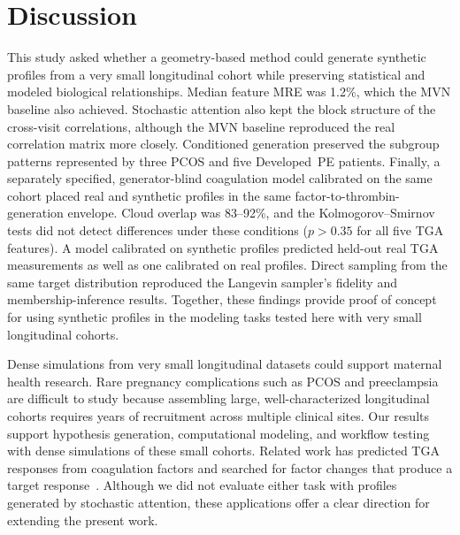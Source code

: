 \section{Discussion}
\label{sec:discussion}

This study asked whether a geometry-based method could generate synthetic profiles from a
very small longitudinal cohort while preserving statistical and modeled biological
relationships. Median feature MRE was 1.2\%, which the MVN baseline also achieved.
Stochastic attention also kept the block structure of the cross-visit correlations,
although the MVN baseline reproduced the real correlation matrix more closely. Conditioned generation preserved the subgroup patterns represented by
three PCOS and five Developed~PE patients. Finally, a separately specified,
generator-blind coagulation model calibrated on the same cohort placed real and synthetic
profiles in the same factor-to-thrombin-generation envelope. Cloud overlap was 83--92\%, and
the Kolmogorov--Smirnov tests did not detect differences under these conditions ($p>0.35$ for
all five TGA features). A model calibrated on synthetic profiles predicted held-out real TGA
measurements as well as one calibrated on real profiles. Direct sampling from the same target
distribution reproduced the Langevin sampler's fidelity and membership-inference results.
Together, these findings provide proof of concept for using synthetic profiles in the modeling
tasks tested here with very small longitudinal cohorts.

Dense simulations from very small longitudinal datasets could support maternal health
research. Rare pregnancy complications such as PCOS and preeclampsia are difficult to study
because assembling large, well-characterized longitudinal cohorts requires years of
recruitment across multiple clinical sites. Our results support hypothesis generation,
computational modeling, and workflow testing with dense simulations of these small cohorts.
Related work has predicted TGA responses from coagulation factors and searched for
factor changes that produce a target response~\citep{Ghetmiri2021}. Although we did not
evaluate either task with profiles generated by stochastic attention, these applications
offer a clear direction for extending the present work.

